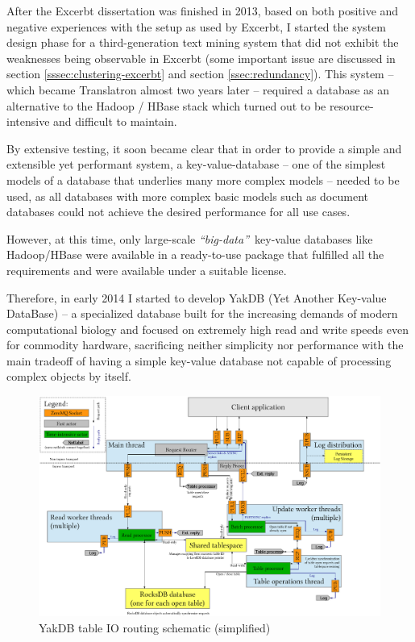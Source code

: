 \documentclass[a4paper, 12pt, twoside, reqn]{report}
\numberwithin{figure}{chapter}
\newtheorem[L]{boxedDefinition}{Definition}
\newtheorem[L]{boxedExample}{Example}
\newcommand{\itquote}[1]{\textit{{``}#1{''}}}
\begin{document}
After the Excerbt dissertation was finished in 2013, based on both positive and negative experiences with the setup as used by Excerbt, I started the system design phase for a third-generation text mining system that did not exhibit the weaknesses being observable in Excerbt (some important issue are discussed in section \ref{sssec:clustering-excerbt} and section \ref{ssec:redundancy}). This system -- which became Translatron almost two years later -- required a database as an alternative to the Hadoop / HBase stack which turned out to be resource-intensive and difficult to maintain.

By extensive testing, it soon became clear that in order to provide a simple and extensible yet performant system, a key-value-database -- one of the simplest models of a database that underlies many more complex models -- needed to be used, as all databases with more complex basic models such as document databases could not achieve the desired performance for all use cases.

However, at this time, only large-scale \itquote{big-data}\ key-value databases like Hadoop/HBase were available in a ready-to-use package that fulfilled all the requirements and were available under a suitable license.

Therefore, in early 2014 I started to develop YakDB (Yet Another Key-value DataBase) -- a specialized database built for the increasing demands of modern computational biology and focused on extremely high read and write speeds  even for commodity hardware, sacrificing neither simplicity nor performance with the main tradeoff of having a simple key-value database not capable of processing complex objects by itself.

\begin{figure}[!htb]
  \centering
  \includegraphics[width=1.5\textwidth,angle=90]{Figures/YakDB-Architecture.eps}
  \caption[YakDB table IO routing schematic]{YakDB table IO routing schematic (simplified)}
  \label{fig:yakdb-architecture}
\end{figure}
\end{document}
